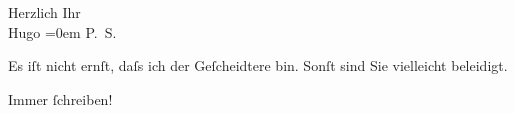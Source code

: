 \pstart
           Herzlich Ihr{\\[\baselineskip]}\spacefill\mbox{Hugo}\pend
           \leftskip=0em{}
\pstart
           \noindent{}\textsc{P. S.}\pend
           
\pstart
           Es iſt nicht ernſt, daſs ich der Geſcheidtere bin. Sonſt sind Sie vielleicht
                  beleidigt.\pend
           
\pstart
           \centering{}{\pb}Immer ſchreiben!\pend
           \endnumbering{}  
      